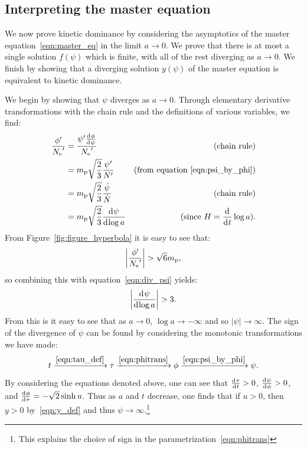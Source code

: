 \subsection{Interpreting the master equation}
\label{sec:interpreting_the_master_equation}

We now prove kinetic dominance by considering the asymptotics of the master equation~\eqref{eqn:master_eq} in the limit \(a\rightarrow0\). We prove that there is at most a single solution \(f(\psi)\) which is finite, with all of the rest diverging as \(a\rightarrow0\). We finish by showing that a diverging solution \(y(\psi)\) of the master equation is equivalent to kinetic dominance.

We begin by showing that \(\psi\) diverges as \(a\rightarrow0\). Through elementary derivative transformations with the chain rule and the definitions of various variables, we find:
%
\begin{align}
  \frac{{{\phi}^\prime}}{{{N_\mathrm{e}}^\prime}} 
  &=
  \frac{{{\psi}^\prime}\frac{\operatorname{d}^{}\!{\phi}}{\operatorname{d}^{}\!{\psi}}}{{{N_\mathrm{e}}^\prime}}
  &\text{(chain rule)} 
  \nonumber
  \\
  &=
  m_{\mathrm{p}}\sqrt{\frac{2}{3}}\frac{{{\psi}^\prime}}{{{N}^\prime}}  
  &\text{(from equation \protect\ref{eqn:psi_by_phi})} 
  \nonumber
  \\
  &=
  m_{\mathrm{p}}\sqrt{\frac{2}{3}}\frac{\dot\psi}{\dot{N}}  
  &\text{(chain rule)} 
  \nonumber
  \\
  &=
  m_{\mathrm{p}}\sqrt{\frac{2}{3}}\frac{\operatorname{d}^{}\!{\psi}}{\operatorname{d}^{}\!{\log a}}
  &\text{(since \(H=\frac{\operatorname{d}^{}\!{}}{\operatorname{d}^{}\!{t}}\log a\))}.
  \label{eqn:div_psi}
\end{align}
%
From Figure~\ref{fig:figure_hyperbola} it is easy to see that:
%
\begin{equation}
  \left|\frac{{{\phi}^\prime}}{{{N_\mathrm{e}}^\prime}}\right| > \sqrt{6}m_{\mathrm{p}}, 
\end{equation}
%
so combining this with equation~\eqref{eqn:div_psi} yields:
%
\begin{equation}
  \left|\frac{\operatorname{d}^{}\!{\psi}}{\operatorname{d}^{}\!{\log a}}\right| > 3. 
\end{equation}
%
From this is it easy to see that as \(a\to0\), \(\log a\to-\infty\) and so \(|\psi|\to\infty\). The sign of the divergence of \(\psi\) can be found by considering the monotonic transformations we have made: %
\begin{equation}
  t
  \xrightarrow{\protect\eqref{eqn:tau_def}}
  \tau
  \xrightarrow{\protect\eqref{eqn:phitrans}}
  \phi
  \xrightarrow{\protect\eqref{eqn:psi_by_phi}}
  \psi.
\end{equation}
%
By considering the equations denoted above, one can see that \(\frac{\operatorname{d}^{}\!{\tau}}{\operatorname{d}^{}\!{t}}>0\), \(\frac{\operatorname{d}^{}\!{\psi}}{\operatorname{d}^{}\!{\phi}}>0\), and \(\frac{\operatorname{d}^{}\!{\phi}}{\operatorname{d}^{}\!{\tau}} = -\sqrt{2}\sinh u\). Thus as \(a\) and \(t\) decrease, one finds that if \(u>0\), then \(y>0\) by~\eqref{eqn:y_def} and thus \(\psi\to\infty\).\footnote{This explains the choice of sign in the parametrization~\protect\eqref{eqn:phitrans}}



